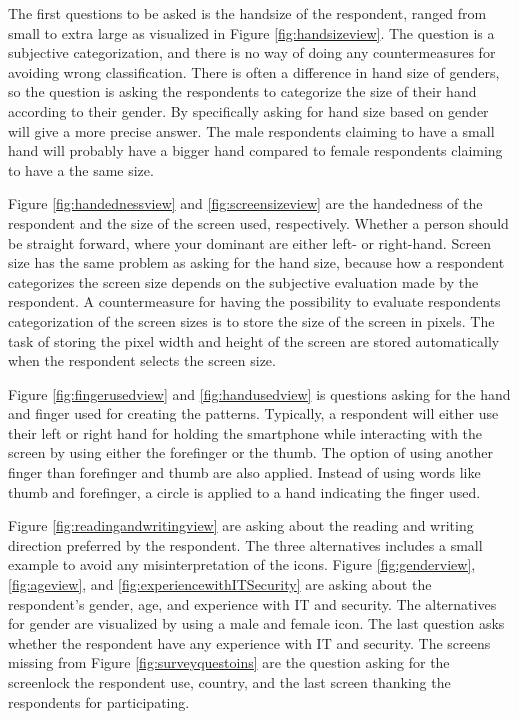     The first questions to be asked is the handsize of the respondent, ranged from small to extra large as visualized in Figure \ref{fig:handsizeview}. The question is a subjective categorization, and there is no way of doing any countermeasures for avoiding wrong classification. There is often a difference in hand size of genders, so the question is asking the respondents to categorize the size of their hand according to their gender. By specifically asking for hand size based on gender will give a more precise answer. The male respondents claiming to have a small hand will probably have a bigger hand compared to female respondents claiming to have a the same size. 

    Figure \ref{fig:handednessview} and \ref{fig:screensizeview} are the handedness of the respondent and the size of the screen used, respectively. Whether a person should be straight forward, where your dominant are either left- or right-hand. Screen size has the same problem as asking for the hand size, because how a respondent categorizes the screen size depends on the subjective evaluation made by the respondent. A countermeasure for having the possibility to evaluate respondents categorization of the screen sizes is to store the size of the screen in pixels. The task of storing the pixel width and height of the screen are stored automatically when the respondent selects the screen size.

    Figure \ref{fig:fingerusedview} and \ref{fig:handusedview} is questions asking for the hand and finger used for creating the patterns. Typically, a respondent will either use their left or right hand for holding the smartphone while interacting with the screen by using either the forefinger or the thumb. The option of using another finger than forefinger and thumb are also applied. Instead of using words like thumb and forefinger, a circle is applied to a hand indicating the finger used. 

    Figure \ref{fig:readingandwritingview} are asking about the reading and writing direction preferred by the respondent. The three alternatives includes a small example to avoid any misinterpretation of the icons. Figure \ref{fig:genderview}, \ref{fig:ageview}, and \ref{fig:experiencewithITSecurity} are asking about the respondent's gender, age, and experience with IT and security. The alternatives for gender are visualized by using a male and female icon. The last question asks whether the respondent have any experience with IT and security. The screens missing from Figure \ref{fig:surveyquestoins} are the question asking for the screenlock the respondent use, country, and the last screen thanking the respondents for participating. 
    

